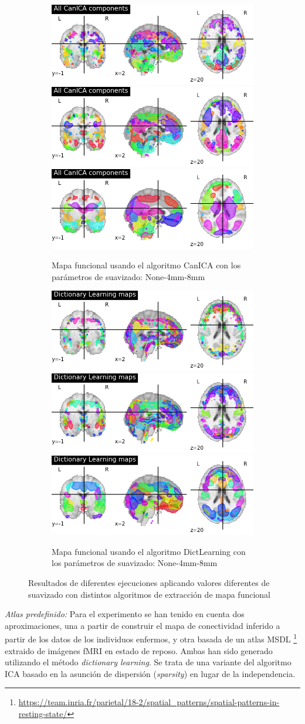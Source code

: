 \begin{figure}[H]
  \begin{subfigure}{\linewidth}
  \includegraphics[width=.3\linewidth]{img/canica/canica_None.png}\hfill
  \includegraphics[width=.3\linewidth]{img/canica/canica_4.png}\hfill
  \includegraphics[width=.3\linewidth]{img/canica/canica_8.png}
  \caption{Mapa funcional usando el algoritmo  CanICA con los parámetros de suavizado: None-4mm-8mm}
  \end{subfigure}\par\medskip
  \begin{subfigure}{\linewidth}
  \includegraphics[width=.3\linewidth]{img/canica/dictlearn_None}\hfill
  \includegraphics[width=.3\linewidth]{img/canica/dictlearn_4}\hfill
  \includegraphics[width=.3\linewidth]{img/canica/dictlearn_8}
  \caption{Mapa funcional usando el algoritmo  DictLearning con los parámetros de suavizado: None-4mm-8mm}
  \end{subfigure}\par\medskip
  \caption{Resultados de diferentes ejecuciones aplicando valores diferentes de suavizado con distintos algoritmos de extracción de mapa funcional}
  \label{preproc:mapa}
\end{figure}

 \textit{Atlas predefinido: } Para el experimento se han tenido en cuenta dos aproximaciones, una a partir de construir el mapa de conectividad inferido a partir de los datos de los individuos enfermos, y otra basada de un atlas MSDL \footnote{\url{https://team.inria.fr/parietal/18-2/spatial_patterns/spatial-patterns-in-resting-state/}} extraido de imágenes fMRI en estado de reposo. Ambas han sido generado utilizando el método \textit{dictionary learning}. Se trata de una variante del algoritmo ICA basado en la asunción de dispersión (\textit{sparsity}) en lugar de la independencia.

